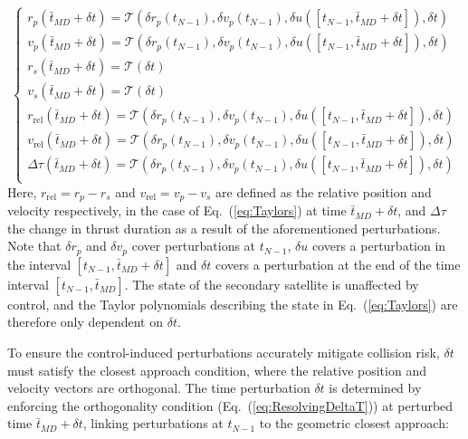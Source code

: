 \documentclass[letterpaper, preprint, paper,11pt]{AAS}	%
\renewcommand{\eqref}[1]{Eq.~(\ref{#1})}
\begin{document}
\begin{equation}\label{eq:Taylors}
	\begin{cases}
		r_p(\bar{t}_{MD} + \delta t) = \mathcal{T}(\delta r_p(t_{N-1}), \delta v_p(t_{N-1}), \delta u([t_{N-1}, \bar{t}_{MD} + \delta t]), \delta t) \\
		v_p(\bar{t}_{MD} + \delta t) = \mathcal{T}(\delta r_p(t_{N-1}), \delta v_p(t_{N-1}), \delta u([t_{N-1}, \bar{t}_{MD} + \delta t]), \delta t) \\
		r_s(\bar{t}_{MD} + \delta t) = \mathcal{T}(\delta t) \\
		v_s(\bar{t}_{MD} + \delta t) = \mathcal{T}(\delta t) \\
		r_{\text{rel}}(\bar{t}_{MD}+ \delta t) = \mathcal{T}(\delta r_p(t_{N-1}), \delta v_p(t_{N-1}), \delta u([t_{N-1}, \bar{t}_{MD} + \delta t]), \delta t) \\
		v_{\text{rel}}(\bar{t}_{MD}+ \delta t) = \mathcal{T}(\delta r_p(t_{N-1}), \delta v_p(t_{N-1}), \delta u([t_{N-1} , \bar{t}_{MD} + \delta t]), \delta t) \\
		\Delta \tau(\bar{t}_{MD}+ \delta t) = \mathcal{T}(\delta r_p(t_{N-1}), \delta v_p(t_{N-1}), \delta u([t_{N-1}, \bar{t}_{MD} + \delta t]), \delta t) \\
	\end{cases}
\end{equation}
Here, $r_{\text{rel}} = r_p - r_s$ and $v_{\text{rel}}  = v_p - v_s$ are defined as the relative position and velocity respectively, in the case of \eqref{eq:Taylors} at time $\bar{t}_{MD} + \delta t$, and $\Delta \tau$ the change in thrust duration as a result of the aforementioned perturbations. Note that $\delta r_p$ and $\delta v_p$ cover perturbations at $t_{N-1}$, $\delta u$ covers a perturbation in the interval $[t_{N-1}, \bar{t}_{MD} + \delta t]$ and $\delta t$ covers a perturbation at the end of the time interval $[t_{N-1}, \bar{t}_{MD}]$. The state of the secondary satellite is unaffected by control, and the Taylor polynomials describing the state in \eqref{eq:Taylors} are therefore only dependent on $\delta t$.

To ensure the control-induced perturbations accurately mitigate collision risk, $\delta t$ must satisfy the closest approach condition, where the relative position and velocity vectors are orthogonal.
The time perturbation $\delta t$ is determined by enforcing the orthogonality condition (\eqref{eq:ResolvingDeltaT}) at perturbed time $\bar{t}_{MD} + \delta t$, linking perturbations at $t_{N-1}$ to the geometric closest approach:
\end{document}
